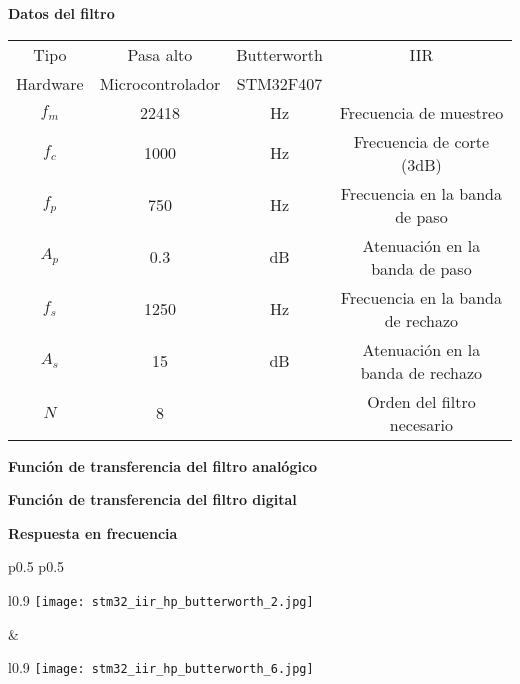 \documentclass[informe.tex]{subfiles}
\begin{document}
\textbf{Datos del filtro}	\newline	
								
	\begin{tabular}{ |c | c| c| c|}
		\hline
  		    Tipo     & Pasa alto & Butterworth &  IIR \\
 			Hardware & Microcontrolador & STM32F407 & \\		
			$ f_m $  & 22418  & Hz & Frecuencia de muestreo \\
			$ f_c $  & 1000  & Hz & Frecuencia de corte (3dB) \\
			$ f_p $  & 750  & Hz & Frecuencia en la banda de paso\\
			$ A_p $  & 0.3  & dB & Atenuación en la banda de paso \\			
			$ f_s $  & 1250  & Hz & Frecuencia en la banda de rechazo \\
			$ A_s $  & 15  & dB & Atenuación en la banda de rechazo \\
			$ N $  & 8  &  & Orden del filtro necesario \\			
		\hline
	\end{tabular}\newline\newline		
	
\textbf{Función de transferencia del filtro analógico}\newline
	\begin{tiny}
		
	\end{tiny}\newline
    	
\textbf{Función de transferencia del filtro digital}\newline
	\begin{tiny}
		
	\end{tiny}\newline
	
\textbf{Respuesta en frecuencia}\newline
	\begin{tabular}{p{0.5\textwidth} p{0.5\textwidth}}		
		\begin{wrapfigure}{l}{0.9\linewidth}
    		\centering
    		\texttt{[image: stm32\_iir\_hp\_butterworth\_2.jpg]}
    		\caption{Filtro analógico}
		\end{wrapfigure}					
		&	
	 	\begin{wrapfigure}{l}{0.9\linewidth}
    		\centering
    		\texttt{[image: stm32\_iir\_hp\_butterworth\_6.jpg]}
    		\caption{Filtro digital}
		\end{wrapfigure}			
	 	\\ 
	\end{tabular}\newpage
	
\end{document}
